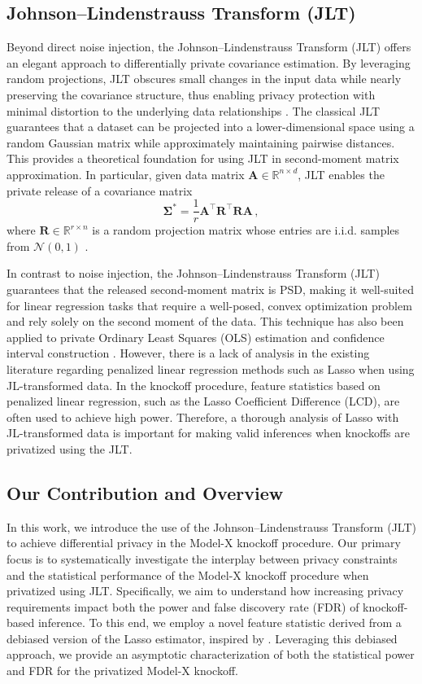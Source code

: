 \documentclass[11pt]{article}
\newcommand{\bA}{\boldsymbol{A}}
\newcommand{\bR}{\boldsymbol{R}}
\newcommand{\bSigma}{\boldsymbol{\Sigma}}
\newcommand{\mbR}{\mathbb{R}}
\newcommand{\mcN}{\mathcal{N}}
\begin{document}
\subsection{Johnson--Lindenstrauss Transform (JLT)}

Beyond direct noise injection, the Johnson--Lindenstrauss Transform (JLT) offers an elegant approach to differentially private covariance estimation. By leveraging random projections, JLT obscures small changes in the input data while nearly preserving the covariance structure, thus enabling privacy protection with minimal distortion to the underlying data relationships \citep{blocki2012johnsonlindenstrauss}. The classical JLT \citep{JL84} guarantees that a dataset can be projected into a lower-dimensional space using a random Gaussian matrix while approximately maintaining pairwise distances. This provides a theoretical foundation for using JLT in second-moment matrix approximation. In particular, given data matrix $\bA\in\mbR^{n\times d}$, JLT enables the private release of a covariance matrix
\[
\bSigma^* = \frac{1}{r} \bA^\top\bR^\top\bR\bA\,,
\]
where $\bR\in\mbR^{r\times n}$ is a random projection matrix whose entries are i.i.d. samples from $\mcN(0,1)$ \citep{blocki2012johnsonlindenstrauss}. 

In contrast to noise injection, the Johnson--Lindenstrauss Transform (JLT) guarantees that the released second-moment matrix is PSD, making it well-suited for linear regression tasks that require a well-posed, convex optimization problem and rely solely on the second moment of the data. This technique has also been applied to private Ordinary Least Squares (OLS) estimation and confidence interval construction \citep{pmlr-v70-sheffet17a}. However, there is a lack of analysis in the existing literature regarding penalized linear regression methods such as Lasso when using JL-transformed data. In the knockoff procedure, feature statistics based on penalized linear regression, such as the Lasso Coefficient Difference (LCD), are often used to achieve high power. Therefore, a thorough analysis of Lasso with JL-transformed data is important for making valid inferences when knockoffs are privatized using the JLT.

\subsection{Our Contribution and Overview}

In this work, we introduce the use of the Johnson--Lindenstrauss Transform (JLT) to achieve differential privacy in the Model-X knockoff procedure. Our primary focus is to systematically investigate the interplay between privacy constraints and the statistical performance of the Model-X knockoff procedure when privatized using JLT. Specifically, we aim to understand how increasing privacy requirements impact both the power and false discovery rate (FDR) of knockoff-based inference. To this end, we employ a novel feature statistic derived from a debiased version of the Lasso estimator, inspired by \cite{JM14}. Leveraging this debiased approach, we provide an asymptotic characterization of both the statistical power and FDR for the privatized Model-X knockoff.
\end{document}

